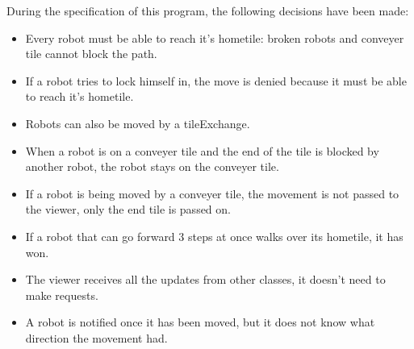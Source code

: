 During the specification of this program, the following decisions have been made:\\
\begin{itemize}
    \item Every robot must be able to reach it's hometile: broken robots and conveyer tile cannot block the path.\\
    \item If a robot tries to lock himself in, the move is denied because it must be able to reach it's hometile.\\
    \item Robots can also be moved by a tileExchange.\\
    \item When a robot is on a conveyer tile and the end of the tile is blocked by another robot, the robot stays on the conveyer tile.\\
    \item If a robot is being moved by a conveyer tile, the movement is not passed to the viewer, only the end tile is passed on.\\
    \item If a robot that can go forward 3 steps at once walks over its hometile, it has won.\\
    \item The viewer receives all the updates from other classes, it doesn't need to make requests.\\
    \item A robot is notified once it has been moved, but it does not know what direction the movement had.\\
\end{itemize} 